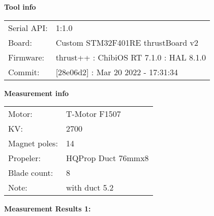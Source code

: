 \documentclass[10pt]{article}
\begin{document}
\noindent
{\large \bf Tool info}
\vspace{3mm}

\noindent
\begin{tabular}{ll}
Serial API:  & 1:1.0\\ 
Board:       & Custom STM32F401RE thrustBoard v2\\ 
Firmware:    & thrust++ : ChibiOS RT 7.1.0 : HAL 8.1.0\\ 
Commit:      & [28e06d2] : Mar 20 2022 - 17:31:34
\end{tabular}
\vspace{3mm}

\noindent
{\large \bf Measurement info}
\vspace{3mm}

\noindent
\begin{tabular}{ll}
Motor:        & T-Motor F1507\\ 
KV:           & 2700\\ 
Magnet poles: & 14\\ 
Propeler:     & HQProp Duct 76mmx8\\ 
Blade count:  & 8\\ 
Note:         & with duct 5.2
\end{tabular}

\vspace{3mm}

\noindent
{\large \bf Measurement Results 1:}
\vspace{3mm}
\end{document}
